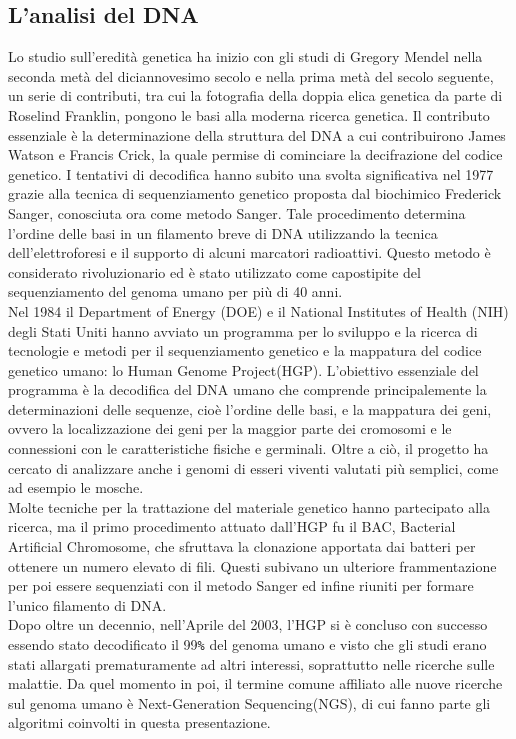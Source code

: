 \subsection{L'analisi del DNA}
Lo studio sull'eredità genetica ha inizio con gli studi di Gregory Mendel nella seconda metà del diciannovesimo secolo e nella prima metà del secolo seguente, un serie di contributi, tra cui la fotografia della doppia elica genetica da parte di Roselind Franklin, pongono le basi alla moderna ricerca genetica. Il contributo essenziale è la determinazione della struttura del DNA a cui contribuirono James Watson e Francis Crick, la quale permise di cominciare la decifrazione del codice genetico. I tentativi di decodifica hanno subito una svolta significativa nel 1977 grazie alla tecnica di sequenziamento genetico proposta dal biochimico Frederick Sanger, conosciuta ora come metodo Sanger. Tale procedimento determina l'ordine delle basi in un filamento breve di DNA utilizzando la tecnica dell'elettroforesi e il supporto di alcuni marcatori radioattivi. Questo metodo è considerato rivoluzionario ed è stato utilizzato come capostipite del sequenziamento del genoma umano per più di 40 anni.\\ 
Nel 1984 il Department of Energy (DOE) e il National Institutes of Health (NIH) degli Stati Uniti hanno avviato un programma per lo sviluppo e la ricerca di tecnologie e metodi per il sequenziamento genetico e la mappatura del codice genetico umano: lo Human Genome Project(HGP). L'obiettivo essenziale del programma è la decodifica del DNA umano che comprende principalemente la determinazioni delle sequenze, cioè l'ordine delle basi, e la mappatura dei geni, ovvero la localizzazione dei geni per la maggior parte dei cromosomi e le connessioni con le caratteristiche fisiche e germinali. Oltre a ciò, il progetto ha cercato di analizzare anche i genomi di esseri viventi valutati più semplici, come ad esempio le mosche.\\
Molte tecniche per la trattazione del materiale genetico hanno partecipato alla ricerca, ma il primo procedimento attuato dall'HGP fu il BAC, Bacterial Artificial Chromosome, che sfruttava la clonazione apportata dai batteri per ottenere un numero elevato di fili. Questi subivano un ulteriore frammentazione per poi essere sequenziati con il metodo Sanger ed infine riuniti per formare l'unico filamento di DNA. \\
Dopo oltre un decennio, nell'Aprile del 2003, l'HGP si è concluso con successo essendo stato decodificato il 99\verb!%! del genoma umano e visto che gli studi erano stati allargati prematuramente ad altri interessi, soprattutto nelle ricerche sulle malattie. Da quel momento in poi, il termine comune affiliato alle nuove ricerche sul genoma umano è Next-Generation Sequencing(NGS), di cui fanno parte gli algoritmi coinvolti in questa presentazione.

